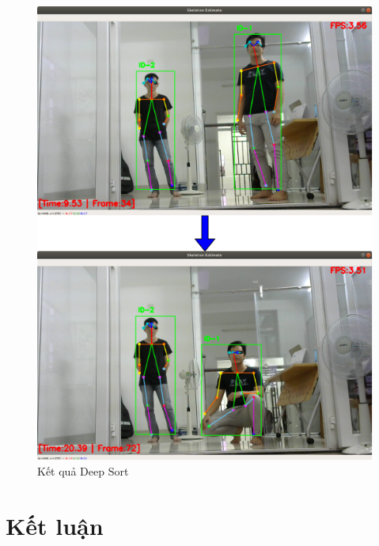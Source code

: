 \FloatBarrier
\begin{figure}[htp]
\begin{center}
\includegraphics[scale=0.8]{chap5/c5_figs/deep_sort.png}
\end{center}
\caption{Kết quả Deep Sort}
\label{fig:deep_sort}
\end{figure}
\FloatBarrier


\section{Kết luận}

